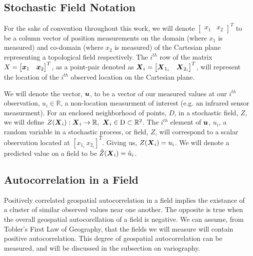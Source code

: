 \documentclass[11pt]{ucthesis}
\newcommand{\vect}[1]{{\it{\boldsymbol{#1}}}}
\begin{document}
\subsection{Stochastic Field Notation}
For the sake of convention throughout this work, we will denote $\begin{bmatrix} x_1 & x_2 \end{bmatrix}^{T}$ to be a column vector of position measurements on the domain (where $x_1$ is measured) and co-domain (where $x_2$ is measured) of the Cartesian plane representing a topological field respectively. The $i^{th}$ row of the matrix $X = \begin{bmatrix} \vect{x}_1 & \vect{x}_2 \end{bmatrix}^{T}$, as a point-pair denoted as $\vect{X}_i = \begin{bmatrix} \vect{X}_{1_i} & \vect{X}_{2_i} \end{bmatrix}^{T}$, will represent the location of the $i^{th}$ observed location on the Cartesian plane.

We will denote the vector, $\vect{u}$, to be a vector of our measured values at our $i^{th}$ observation, $u_i \in \mathbb{R}$, a non-location measurment of interest (e.g. an infrared sensor measurment). For an enclosed neighborhood of points, $D$, in a stochastic field, $Z$, we will define $Z(\vect{X}_i): \vect{X}_i \rightarrow \mathbb{R},\ \vect{X}_i \in \rm{D} \subset \mathbb{R}^2$. The $i^{th}$ element of $\vect{u}$, $u_i$, a random variable in a stochastic process, or field, $Z$, will correspond to a scalar observation located at $[x_{1_i}\ x_{2_i}]^{T}$. Giving us, $Z(\vect{X}_i)=u_i$. We will denote a predicted value on a field to be $\hat{Z}(\vect{X}_i)=\hat{u}_i$.

\subsection{Autocorrelation in a Field}
Positively correlated geospatial autocorrelation in a field implies the existance of a cluster of similar observed values near one another. The opposite is true when the overall geospatial autocorellation of a field is negative. We can assume, from Tobler's First Law of Geography, that the fields we will measure will contain positive autocorrelation. This degree of geospatial autocorrelation can be measured, and will be discussed in the subsection on variography.
\end{document}
